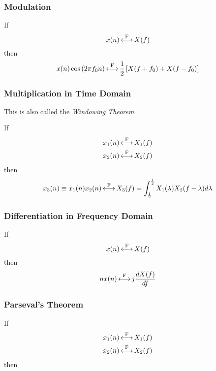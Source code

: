 \subsubsection{Modulation}\label{subsubsec:FourierTransformProperties-Modulation}
If
\begin{equation*}
  x(n) \operatorname{\overset{F}{\longleftrightarrow}} X(f)
\end{equation*}
then
\begin{equation}\label{eq:FourierTransformProperties-Modulation}
  x(n) \cos \left( 2 \pi f_{0} n \right) \operatorname{\overset{F}{\longleftrightarrow}} \frac{1}{2} \left[ X(f + f_{0}) + X(f - f_{0}) \right]
\end{equation}

\subsubsection{Multiplication in Time Domain}\label{subsubsec:FourierTransformProperties-MultiplicationTimeDomain}
This is also called the \emph{Windowing Theorem}.

If
\begin{equation*}
  \begin{aligned}
    x_{1}(n) &\operatorname{\overset{F}{\longleftrightarrow}} X_{1}(f) \\
    x_{2}(n) &\operatorname{\overset{F}{\longleftrightarrow}} X_{2}(f) \\
  \end{aligned}
\end{equation*}
then
\begin{equation}\label{eq:FourierTransformProperties-MultiplicationTimeDomain}
  x_{3}(n) \equiv x_{1}(n)x_{2}(n) \operatorname{\overset{F}{\longleftrightarrow}} X_{3}(f) = \int_{\frac{1}{2}}^{\frac{1}{2}} X_{1}(\lambda) X_{2}(f-\lambda) d\lambda
\end{equation}

\subsubsection{Differentiation in Frequency Domain}\label{subsubsec:FourierTransformProperties-DifferentiationFrequencyDomain}
If
\begin{equation*}
  x(n) \operatorname{\overset{F}{\longleftrightarrow}} X(f)
\end{equation*}
then
\begin{equation}\label{eq:FourierTransformProperties-DifferentiationFrequencyDomain}
  n x(n) \operatorname{\overset{F}{\longleftrightarrow}} j \frac{d X(f)}{df}
\end{equation}

\subsubsection{Parseval's Theorem}\label{subsubsec:FourierTransformProperties-ParsevalsTheorem}
If
\begin{equation*}
  \begin{aligned}
    x_{1}(n) &\operatorname{\overset{F}{\longleftrightarrow}} X_{1}(f) \\
    x_{2}(n) &\operatorname{\overset{F}{\longleftrightarrow}} X_{2}(f) \\
  \end{aligned}
\end{equation*}
then

